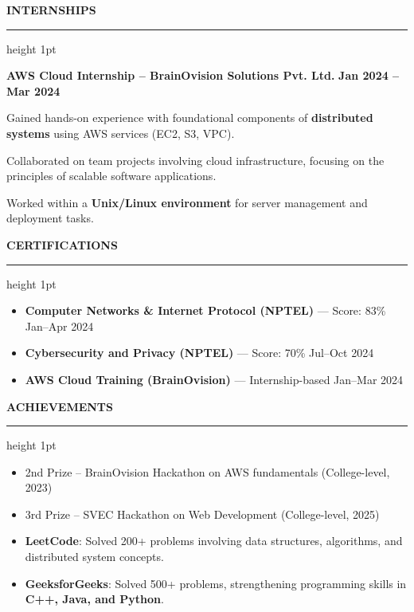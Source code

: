\documentclass[10pt,a4paper]{article}
\newenvironment{tightitemize}{
  \begin{itemize}[leftmargin=25pt, itemsep=2pt, parsep=2pt, topsep=2pt, partopsep=0pt]
}{
  \end{itemize}
}
\newcommand{\compactspace}{\vspace{6pt}}
\newcommand{\sectiongap}{\vspace{14pt}}
\newcommand{\resumesection}[1]{
    \sectiongap
    {\color{primary} \large \textbf{#1}} \\
    \hrule height 1pt \compactspace
}
\begin{document}
\resumesection{INTERNSHIPS}
\textbf{AWS Cloud Internship – BrainOvision Solutions Pvt. Ltd.} \hfill \textbf{Jan 2024 -- Mar 2024}
\begin{tightitemize}
    {\leftskip=15pt
        \item Gained hands-on experience with foundational components of \textbf{distributed systems} using AWS services (EC2, S3, VPC).
        \item Collaborated on team projects involving cloud infrastructure, focusing on the principles of scalable software applications.
        \item Worked within a \textbf{Unix/Linux environment} for server management and deployment tasks.
    \par}
\end{tightitemize}

\resumesection{CERTIFICATIONS}
\begin{itemize}
    \item \textbf{Computer Networks \& Internet Protocol (NPTEL)} — Score: 83\% \hfill Jan--Apr 2024
    \item \textbf{Cybersecurity and Privacy (NPTEL)} — Score: 70\% \hfill Jul--Oct 2024
    \item \textbf{AWS Cloud Training (BrainOvision)} — Internship-based \hfill Jan--Mar 2024
\end{itemize}

\resumesection{ACHIEVEMENTS}
\begin{itemize}
    \item 2nd Prize – BrainOvision Hackathon on AWS fundamentals (College-level, 2023)
    \item 3rd Prize – SVEC Hackathon on Web Development (College-level, 2025)
    \item \textbf{LeetCode}: Solved 200+ problems involving data structures, algorithms, and distributed system concepts.
    \item \textbf{GeeksforGeeks}: Solved 500+ problems, strengthening programming skills in \textbf{C++, Java, and Python}.
\end{itemize}
\end{document}
